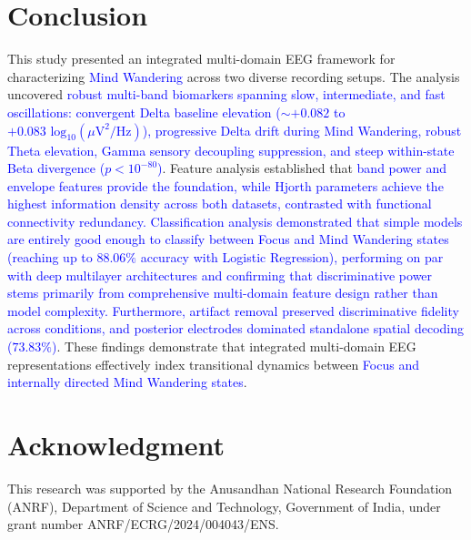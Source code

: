 \documentclass[conference]{IEEEtran}
\begin{document}
\section{Conclusion}

This study presented an integrated multi-domain EEG framework for characterizing \textcolor{blue}{Mind Wandering} across two diverse recording setups. The analysis uncovered \textcolor{blue}{robust multi-band biomarkers spanning slow, intermediate, and fast oscillations: convergent Delta baseline elevation ($\sim+0.082$ to $+0.083\text{ log}_{10}(\mu\text{V}^2/\text{Hz})$), progressive Delta drift during Mind Wandering, robust Theta elevation, Gamma sensory decoupling suppression, and steep within-state Beta divergence ($p < 10^{-80}$)}. Feature analysis established that \textcolor{blue}{band power and envelope features provide the foundation, while Hjorth parameters achieve the highest information density across both datasets, contrasted with functional connectivity redundancy. Classification analysis demonstrated that simple models are entirely good enough to classify between Focus and Mind Wandering states (reaching up to $88.06\%$ accuracy with Logistic Regression), performing on par with deep multilayer architectures and confirming that discriminative power stems primarily from comprehensive multi-domain feature design rather than model complexity. Furthermore, artifact removal preserved discriminative fidelity across conditions, and posterior electrodes dominated standalone spatial decoding ($73.83\%$)}. These findings demonstrate that integrated multi-domain EEG representations effectively index transitional dynamics between \textcolor{blue}{Focus and internally directed Mind Wandering states}.

\section*{Acknowledgment}
This research was supported by the Anusandhan National Research Foundation (ANRF), Department of Science and Technology, Government of India, under grant number ANRF/ECRG/2024/004043/ENS.

\clearpage


\end{document}
